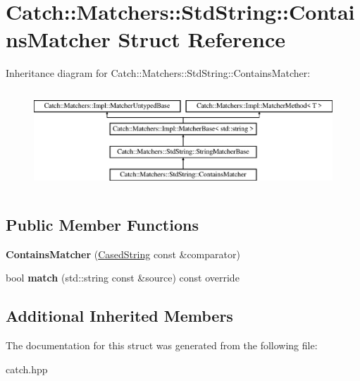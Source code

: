 \hypertarget{structCatch_1_1Matchers_1_1StdString_1_1ContainsMatcher}{}\section{Catch\+::Matchers\+::Std\+String\+::Contains\+Matcher Struct Reference}
\label{structCatch_1_1Matchers_1_1StdString_1_1ContainsMatcher}
Inheritance diagram for Catch\+::Matchers\+::Std\+String\+::Contains\+Matcher\+:\begin{figure}[H]
\begin{center}
\leavevmode
\includegraphics[height=3.758389cm]{structCatch_1_1Matchers_1_1StdString_1_1ContainsMatcher}
\end{center}
\end{figure}
\subsection*{Public Member Functions}
\begin{DoxyCompactItemize}
\item 
\mbox{\label{structCatch_1_1Matchers_1_1StdString_1_1ContainsMatcher_acc892883c8409e34b28c9b39d4ef1fe3}} 
{\bfseries Contains\+Matcher} (\mbox{\hyperlink{structCatch_1_1Matchers_1_1StdString_1_1CasedString}{Cased\+String}} const \&comparator)
\item 
\mbox{\label{structCatch_1_1Matchers_1_1StdString_1_1ContainsMatcher_a630628b234b037be83fe587081a80b53}} 
bool {\bfseries match} (std\+::string const \&source) const override
\end{DoxyCompactItemize}
\subsection*{Additional Inherited Members}


The documentation for this struct was generated from the following file\+:\begin{DoxyCompactItemize}
\item 
catch.\+hpp\end{DoxyCompactItemize}
